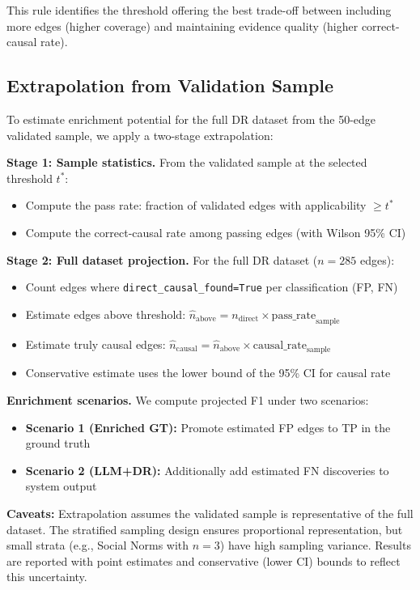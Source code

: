 This rule identifies the threshold offering the best trade-off between including more edges (higher coverage) and maintaining evidence quality (higher correct-causal rate).

\subsection{Extrapolation from Validation Sample}
\label{sec:rq3_extrapolation}

To estimate enrichment potential for the full DR dataset from the 50-edge validated sample, we apply a two-stage extrapolation:

\textbf{Stage 1: Sample statistics.} From the validated sample at the selected threshold $t^*$:
\begin{itemize}[noitemsep]
    \item Compute the pass rate: fraction of validated edges with applicability $\geq t^*$
    \item Compute the correct-causal rate among passing edges (with Wilson 95\% CI)
\end{itemize}

\textbf{Stage 2: Full dataset projection.} For the full DR dataset ($n=285$ edges):
\begin{itemize}[noitemsep]
    \item Count edges where \texttt{direct\_causal\_found=True} per classification (FP, FN)
    \item Estimate edges above threshold: $\hat{n}_{\text{above}} = n_{\text{direct}} \times \text{pass\_rate}_{\text{sample}}$
    \item Estimate truly causal edges: $\hat{n}_{\text{causal}} = \hat{n}_{\text{above}} \times \text{causal\_rate}_{\text{sample}}$
    \item Conservative estimate uses the lower bound of the 95\% CI for causal rate
\end{itemize}

\textbf{Enrichment scenarios.} We compute projected F1 under two scenarios:
\begin{itemize}[noitemsep]
    \item \textbf{Scenario 1 (Enriched GT):} Promote estimated FP edges to TP in the ground truth
    \item \textbf{Scenario 2 (LLM+DR):} Additionally add estimated FN discoveries to system output
\end{itemize}

\textbf{Caveats:} Extrapolation assumes the validated sample is representative of the full dataset. The stratified sampling design ensures proportional representation, but small strata (e.g., Social Norms with $n=3$) have high sampling variance. Results are reported with point estimates and conservative (lower CI) bounds to reflect this uncertainty.

